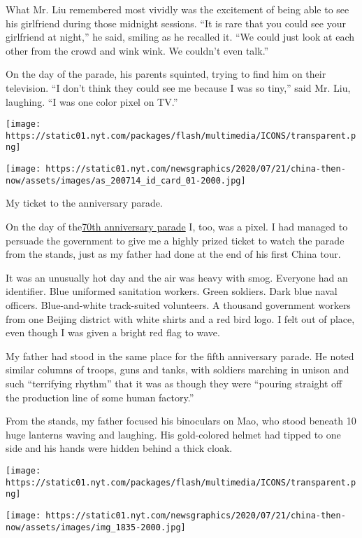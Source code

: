 What Mr. Liu remembered most vividly was the excitement of being able to
see his girlfriend during those midnight sessions. ``It is rare that you
could see your girlfriend at night,'' he said, smiling as he recalled
it. ``We could just look at each other from the crowd and wink wink. We
couldn't even talk.''

On the day of the parade, his parents squinted, trying to find him on
their television. ``I don't think they could see me because I was so
tiny,'' said Mr. Liu, laughing. ``I was one color pixel on TV.''

\texttt{[image: https://static01.nyt.com/packages/flash/multimedia/ICONS/transparent.png]}

\texttt{[image: https://static01.nyt.com/newsgraphics/2020/07/21/china-then-now/assets/images/as\_200714\_id\_card\_01-2000.jpg]}

My ticket to the anniversary parade.

On the day of
the\href{https://www.nytimes.com/2019/09/28/world/asia/china-national-day-70th-anniversary.html}{}\href{https://www.nytimes.com/2019/09/28/world/asia/china-national-day-70th-anniversary.html}{70th
anniversary parade} I, too, was a pixel. I had managed to persuade the
government to give me a highly prized ticket to watch the parade from
the stands, just as my father had done at the end of his first China
tour.

It was an unusually hot day and the air was heavy with smog. Everyone
had an identifier. Blue uniformed sanitation workers. Green soldiers.
Dark blue naval officers. Blue-and-white track-suited volunteers. A
thousand government workers from one Beijing district with white shirts
and a red bird logo. I felt out of place, even though I was given a
bright red flag to wave.

My father had stood in the same place for the fifth anniversary parade.
He noted similar columns of troops, guns and tanks, with soldiers
marching in unison and such ``terrifying rhythm'' that it was as though
they were ``pouring straight off the production line of some human
factory.''

From the stands, my father focused his binoculars on Mao, who stood
beneath 10 huge lanterns waving and laughing. His gold-colored helmet
had tipped to one side and his hands were hidden behind a thick cloak.

\texttt{[image: https://static01.nyt.com/packages/flash/multimedia/ICONS/transparent.png]}

\texttt{[image: https://static01.nyt.com/newsgraphics/2020/07/21/china-then-now/assets/images/img\_1835-2000.jpg]}

